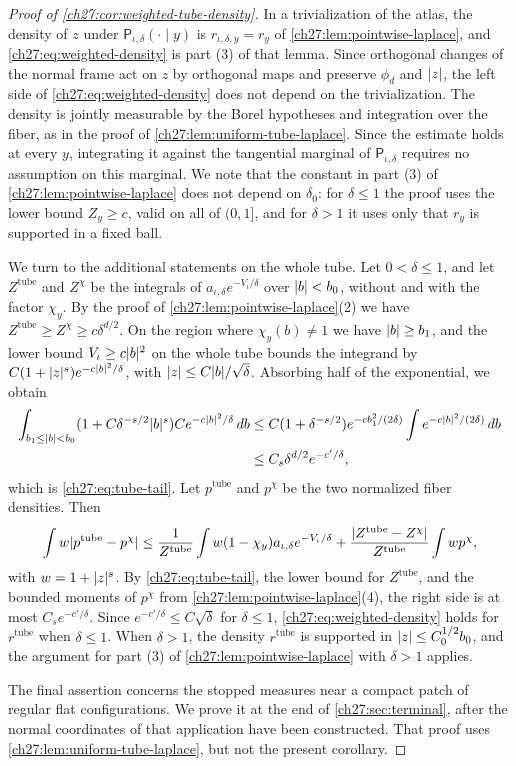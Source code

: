 \begin{proof}[Proof of \cref{ch27:cor:weighted-tube-density}]
In a trivialization of the atlas, the density of $z$ under $\mathsf P_{\iota,\delta}(\cdot\mid y)$ is $r_{\iota,\delta,y}=r_y$ of \cref{ch27:lem:pointwise-laplace}, and \eqref{ch27:eq:weighted-density} is part (3) of that lemma. Since orthogonal changes of the normal frame act on $z$ by orthogonal maps and preserve $\phi_d$ and $\lvert z\rvert$, the left side of \eqref{ch27:eq:weighted-density} does not depend on the trivialization. The density is jointly measurable by the Borel hypotheses and integration over the fiber, as in the proof of \cref{ch27:lem:uniform-tube-laplace}. Since the estimate holds at every $y$, integrating it against the tangential marginal of $\mathsf P_{\iota,\delta}$ requires no assumption on this marginal. We note that the constant in part (3) of \cref{ch27:lem:pointwise-laplace} does not depend on $\delta_0$: for $\delta\le1$ the proof uses the lower bound $Z_y\ge c$, valid on all of $(0,1]$, and for $\delta>1$ it uses only that $r_y$ is supported in a fixed ball.

We turn to the additional statements on the whole tube. Let $0<\delta\le1$, and let $Z^{\mathrm{tube}}$ and $Z^\chi$ be the integrals of $a_{\iota,\delta}e^{-V_\iota/\delta}$ over $\lvert b\rvert<b_0$, without and with the factor $\chi_y$. By the proof of \cref{ch27:lem:pointwise-laplace}(2) we have $Z^{\mathrm{tube}}\ge Z^\chi\ge c\delta^{d/2}$. On the region where $\chi_y(b)\ne1$ we have $\lvert b\rvert\ge b_1$, and the lower bound $V_\iota\ge c\lvert b\rvert^2$ on the whole tube bounds the integrand by $C(1+\lvert z\rvert^s)e^{-c\lvert b\rvert^2/\delta}$, with $\lvert z\rvert\le C\lvert b\rvert/\sqrt\delta$. Absorbing half of the exponential, we obtain
\begin{align*}
 \int_{b_1\le\lvert b\rvert<b_0}(1+C\delta^{-s/2}\lvert b\rvert^s)Ce^{-c\lvert b\rvert^2/\delta}\,db&\le C(1+\delta^{-s/2})e^{-cb_1^2/(2\delta)}\int e^{-c\lvert b\rvert^2/(2\delta)}\,db\\
 &\le C_s\delta^{d/2}e^{-c'/\delta},
\end{align*}
which is \eqref{ch27:eq:tube-tail}. Let $p^{\mathrm{tube}}$ and $p^\chi$ be the two normalized fiber densities. Then
\[
 \int w\lvert p^{\mathrm{tube}}-p^\chi\rvert\le\frac1{Z^{\mathrm{tube}}}\int w(1-\chi_y)a_{\iota,\delta}e^{-V_\iota/\delta}+\frac{\lvert Z^{\mathrm{tube}}-Z^\chi\rvert}{Z^{\mathrm{tube}}}\int wp^\chi,
\]
with $w=1+\lvert z\rvert^s$. By \eqref{ch27:eq:tube-tail}, the lower bound for $Z^{\mathrm{tube}}$, and the bounded moments of $p^\chi$ from \cref{ch27:lem:pointwise-laplace}(4), the right side is at most $C_se^{-c'/\delta}$. Since $e^{-c'/\delta}\le C\sqrt\delta$ for $\delta\le1$, \eqref{ch27:eq:weighted-density} holds for $r^{\mathrm{tube}}$ when $\delta\le1$. When $\delta>1$, the density $r^{\mathrm{tube}}$ is supported in $\lvert z\rvert\le C_0^{1/2}b_0$, and the argument for part (3) of \cref{ch27:lem:pointwise-laplace} with $\delta>1$ applies.

The final assertion concerns the stopped measures near a compact patch of regular flat configurations. We prove it at the end of \cref{ch27:sec:terminal}, after the normal coordinates of that application have been constructed. That proof uses \cref{ch27:lem:uniform-tube-laplace}, but not the present corollary.
\end{proof}

